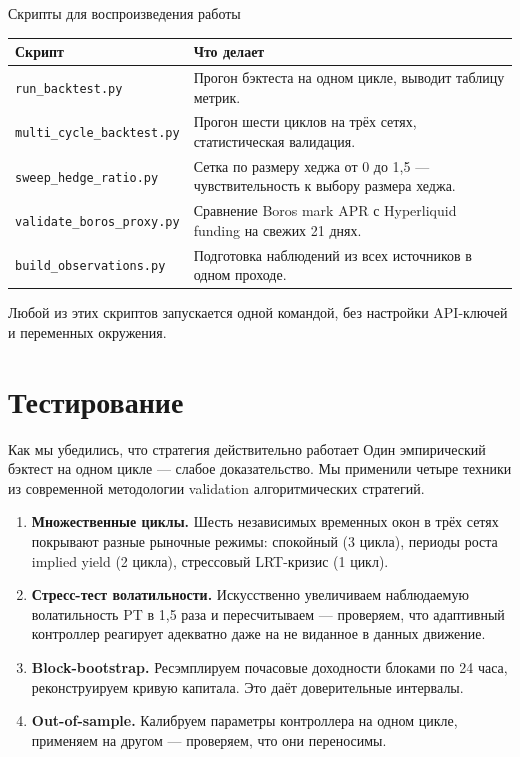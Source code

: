 \documentclass[11pt,aspectratio=169]{beamer}
\begin{document}
\begin{frame}{Скрипты для воспроизведения работы}
  \footnotesize
  \begin{tabular}{p{4.4cm}p{10.0cm}}
    \toprule
    Скрипт & Что делает \\
    \midrule
    \texttt{run\_backtest.py} & Прогон бэктеста на одном цикле, выводит
    таблицу метрик. \\
    \addlinespace[2pt]
    \texttt{multi\_cycle\_backtest.py} & Прогон шести циклов на трёх
    сетях, статистическая валидация. \\
    \addlinespace[2pt]
    \texttt{sweep\_hedge\_ratio.py} & Сетка по размеру хеджа от 0 до 1{,}5
    --- чувствительность к выбору размера хеджа. \\
    \addlinespace[2pt]
    \texttt{validate\_boros\_proxy.py} & Сравнение Boros mark APR с
    Hyperliquid funding на свежих 21 днях. \\
    \addlinespace[2pt]
    \texttt{build\_observations.py} & Подготовка наблюдений из всех
    источников в одном проходе. \\
    \bottomrule
  \end{tabular}

  \vspace{0.5em}
  \normalsize
  Любой из этих скриптов запускается одной командой, без настройки
  API-ключей и переменных окружения.
\end{frame}

\section{Тестирование}

\begin{frame}{Как мы убедились, что стратегия действительно работает}
  Один эмпирический бэктест на одном цикле --- слабое доказательство.
  Мы применили четыре техники из современной методологии validation
  алгоритмических стратегий.

  \vspace{0.4em}
  \begin{enumerate}\itemsep0.3em
    \item \textbf{Множественные циклы.} Шесть независимых временных окон
          в трёх сетях покрывают разные рыночные режимы:
          спокойный (3 цикла), периоды роста implied yield (2 цикла),
          стрессовый LRT-кризис (1 цикл).
    \item \textbf{Стресс-тест волатильности.} Искусственно увеличиваем
          наблюдаемую волатильность PT в 1{,}5 раза и пересчитываем ---
          проверяем, что адаптивный контроллер реагирует адекватно
          даже на не виданное в данных движение.
    \item \textbf{Block-bootstrap.} Ресэмплируем почасовые доходности
          блоками по 24 часа, реконструируем кривую капитала. Это даёт
          доверительные интервалы.
    \item \textbf{Out-of-sample.} Калибруем параметры контроллера на
          одном цикле, применяем на другом --- проверяем, что они
          переносимы.
  \end{enumerate}
\end{frame}
\end{document}
